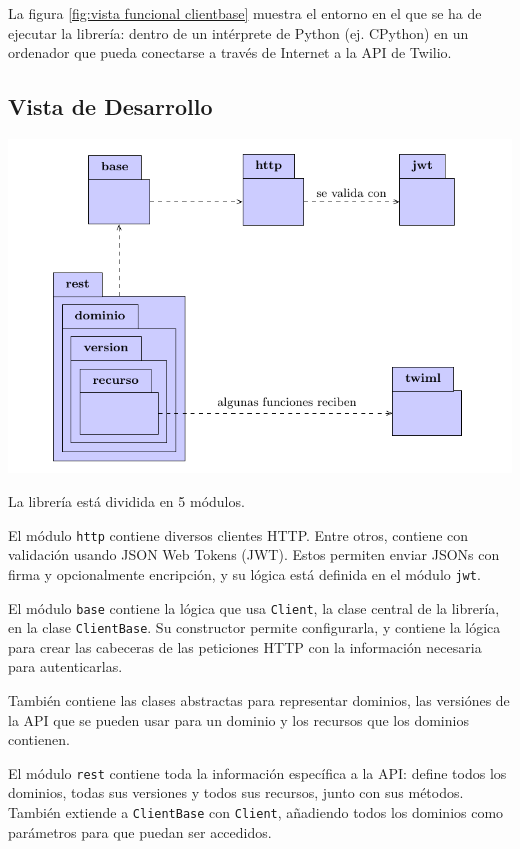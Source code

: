 \documentclass{article}
\begin{document}
\hfill

La figura \ref{fig:vista funcional clientbase}
muestra el entorno en el que se ha de ejecutar la librería:
dentro de un intérprete de Python (ej. CPython)
en un ordenador que pueda conectarse a través de Internet
a la API de Twilio.

\subsection{Vista de Desarrollo}

\includegraphics{vista_desarrollo.pdf}

La librería está dividida en 5 módulos.

\hfill

El módulo \verb|http| contiene diversos clientes HTTP.
Entre otros, contiene con validación usando JSON Web Tokens (JWT).
Estos permiten enviar JSONs con firma y opcionalmente encripción,
y su lógica está definida en el módulo \verb|jwt|.

\hfill

El módulo \verb|base| contiene
la lógica que usa \verb|Client|,
la clase central de la librería,
en la clase \verb|ClientBase|.
Su constructor permite configurarla,
y contiene la lógica para 
crear las cabeceras de las peticiones HTTP
con la información necesaria para autenticarlas.

También contiene las clases abstractas
para representar dominios,
las versiónes de la API que se pueden usar para un dominio
y los recursos que los dominios contienen.

\hfill

El módulo \verb|rest|
contiene toda la información específica a la API:
define todos los dominios,
todas sus versiones y todos sus recursos,
junto con sus métodos.
También extiende a \verb|ClientBase| con \verb|Client|,
añadiendo todos los dominios como parámetros
para que puedan ser accedidos.
\end{document}
